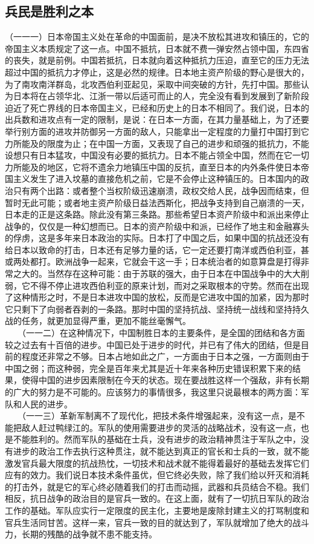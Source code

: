 \documentclass[cn,11pt,chinese]{elegantbook}
\def\myformat#1{\hfil\hfil #1}
\begin{document}
\subsection*{\myformat{兵民是胜利之本}}
（一一一）日本帝国主义处在革命的中国面前，是决不放松其进攻和镇压的，它的帝国主义本质规定了这一点。中国不抵抗，日本就不费一弹安然占领中国，东四省的丧失，就是前例。中国若抵抗，日本就向着这种抵抗力压迫，直至它的压力无法超过中国的抵抗力才停止，这是必然的规律。日本地主资产阶级的野心是很大的，为了南攻南洋群岛，北攻西伯利亚起见，采取中间突破的方针，先打中国。那些认为日本将在占领华北、江浙一带以后适可而止的人，完全没有看到发展到了新阶段迫近了死亡界线的日本帝国主义，已经和历史上的日本不相同了。我们说，日本的出兵数和进攻点有一定的限制，是说：在日本一方面，在其力量基础上，为了还要举行别方面的进攻并防御另一方面的敌人，只能拿出一定程度的力量打中国打到它力所能及的限度为止；在中国一方面，又表现了自己的进步和顽强的抵抗力，不能设想只有日本猛攻，中国没有必要的抵抗力。日本不能占领全中国，然而在它一切力所能及的地区，它将不遗余力地镇压中国的反抗，直至日本的内外条件使日本帝国主义发生了进入坟墓的直接危机之前，它是不会停止这种镇压的。日本国内的政治只有两个出路：或者整个当权阶级迅速崩溃，政权交给人民，战争因而结束，但暂时无此可能；或者地主资产阶级日益法西斯化，把战争支持到自己崩溃的一天，日本走的正是这条路。除此没有第三条路。那些希望日本资产阶级中和派出来停止战争的，仅仅是一种幻想而已。日本的资产阶级中和派，已经作了地主和金融寡头的俘虏，这是多年来日本政治的实际。日本打了中国之后，如果中国的抗战还没有给日本以致命的打击，日本还有足够力量的话，它一定还要打南洋或西伯利亚，甚或两处都打。欧洲战争一起来，它就会干这一手；日本统治者的如意算盘是打得非常之大的。当然存在这种可能：由于苏联的强大，由于日本在中国战争中的大大削弱，它不得不停止进攻西伯利亚的原来计划，而对之采取根本的守势。然而在出现了这种情形之时，不是日本进攻中国的放松，反而是它进攻中国的加紧，因为那时它只剩下了向弱者吞剥的一条路。那时中国的坚持抗战、坚持统一战线和坚持持久战的任务，就更加显得严重，更加不能丝毫懈气。\\
　　（一一二）在这种情况下，中国制胜日本的主要条件，是全国的团结和各方面较之过去有十百倍的进步。中国已处于进步的时代，并已有了伟大的团结，但是目前的程度还非常之不够。日本占地如此之广，一方面由于日本之强，一方面则由于中国之弱；而这种弱，完全是百年来尤其是近十年来各种历史错误积累下来的结果，使得中国的进步因素限制在今天的状态。现在要战胜这样一个强敌，非有长期的广大的努力是不可能的。应该努力的事情很多，我这里只说最根本的两方面：军队和人民的进步。\\
　　（一一三）革新军制离不了现代化，把技术条件增强起来，没有这一点，是不能把敌人赶过鸭绿江的。军队的使用需要进步的灵活的战略战术，没有这一点，也是不能胜利的。然而军队的基础在士兵，没有进步的政治精神贯注于军队之中，没有进步的政治工作去执行这种贯注，就不能达到真正的官长和士兵的一致，就不能激发官兵最大限度的抗战热忱，一切技术和战术就不能得着最好的基础去发挥它们应有的效力。我们说日本技术条件虽优，但它终必失败，除了我们给以歼灭和消耗的打击外，就是它的军心终必随着我们的打击而动摇，武器和兵员结合不稳。我们相反，抗日战争的政治目的是官兵一致的。在这上面，就有了一切抗日军队的政治工作的基础。军队应实行一定限度的民主化，主要地是废除封建主义的打骂制度和官兵生活同甘苦。这样一来，官兵一致的目的就达到了，军队就增加了绝大的战斗力，长期的残酷的战争就不患不能支持。\\
\end{document}
